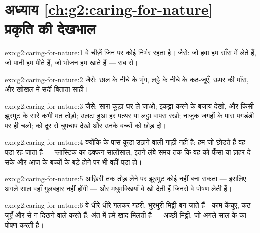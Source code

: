 \section*{अध्याय \ref{ch:g2:caring-for-nature} --- प्रकृति की देखभाल}

\begin{solution}{exo:g2:caring-for-nature:1}
वे चीज़ें जिन पर कोई  निर्भर रहता है। जैसे: जो हवा हम साँस में
लेते हैं, जो पानी हम पीते हैं, जो भोजन हम खाते हैं --- सब 
से।
\end{solution}

\begin{solution}{exo:g2:caring-for-nature:2}
जैसे: छाल के नीचे के भृंग, लट्ठे के नीचे के कठ-जूएँ, ऊपर की मॉस, और
खोखल में सर्दी बिताता साही।
\end{solution}

\begin{solution}{exo:g2:caring-for-nature:3}
जैसे: सारा कूड़ा घर ले जाओ; इकट्ठा करने के बजाय देखो, और किसी झुरमुट
के सारे  कभी मत तोड़ो; उलटा हुआ हर पत्थर या लट्ठा वापस रखो; नाज़ुक
जगहों के पास पगडंडी पर ही चलो;  को दूर से चुपचाप देखो और उनके
बच्चों को छोड़ दो।
\end{solution}

\begin{solution}{exo:g2:caring-for-nature:4}
क्योंकि  के पास कूड़ा उठाने वाली गाड़ी नहीं है: हम जो छोड़ते हैं
वह पड़ा रह जाता है --- प्लास्टिक का ढक्कन सालोंसाल, इतने लंबे समय तक
कि वह  को फँसा या ज़हर दे सके और आज के बच्चों के बड़े होने पर भी
वहीं पड़ा हो।
\end{solution}

\begin{solution}{exo:g2:caring-for-nature:5}
आख़िरी  तक तोड़ लेने पर झुरमुट कोई  नहीं बना सकता --- इसलिए अगले
साल वहाँ गुलबहार नहीं होंगी --- और मधुमक्खियाँ वे  खो देती हैं
जिनसे वे पोषण लेती हैं।
\end{solution}

\begin{solution}{exo:g2:caring-for-nature:6}
वे धीरे-धीरे गलकर गहरी, भुरभुरी मिट्टी बन जाते हैं। काम केंचुए,
कठ-जूएँ और  से न दिखने वाले  करते हैं; अंत में हमें खाद
मिलती है --- अच्छी मिट्टी, जो अगले साल के  का पोषण करती है।
\end{solution}


